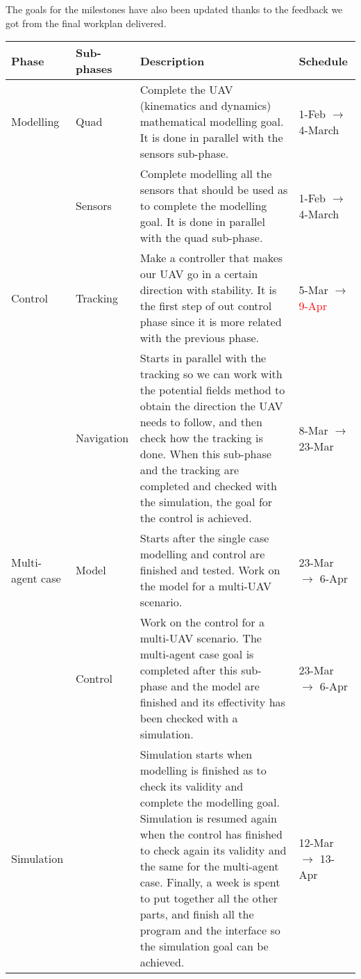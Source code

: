 \documentclass{article}
\begin{document}
The goals for the milestones have also been updated thanks to the feedback we got from the final workplan delivered.
	\begin{center}
	\begin{tabular}[H]{|C{2cm}|C{2cm}|C{7cm}|C{3cm}|} \hline
		Phase & Sub-phases & Description & Schedule\\ \hline
		Modelling & Quad & Complete the UAV (kinematics and dynamics) mathematical modelling goal. It is done in parallel with the sensors sub-phase. &  1-Feb $\rightarrow$ 4-March  \\ 
		& Sensors & Complete modelling all the sensors that should be used as to complete the modelling goal. It is done in parallel with the quad sub-phase. & 1-Feb $\rightarrow$ 4-March \\ \hline
		
		Control & Tracking & Make a controller that makes our UAV go in a certain direction with stability. It is the first step of out control phase since it is more related with the previous phase. &  5-Mar $\rightarrow$ \textcolor{red}{9-Apr}\\ 
		&Navigation & Starts in parallel with the tracking so we can work with the potential fields method to obtain the direction the UAV needs to follow, and then check how the tracking is done. When this sub-phase and the tracking are completed and checked with the simulation, the goal for the control is achieved. & 8-Mar $\rightarrow$ 23-Mar \\ \hline
		
		Multi-agent case & Model & Starts after the single case modelling and control are finished and tested. Work on the model for a multi-UAV scenario. & 23-Mar $\rightarrow$ 6-Apr\\ 
		&Control & Work on the control for a multi-UAV scenario. The multi-agent case goal is completed after this sub-phase and the model are finished and its effectivity has been checked with a simulation. & 23-Mar $\rightarrow$ 6-Apr \\ \hline
		
		Simulation & & Simulation starts when modelling is finished as to check its validity and complete the modelling goal. Simulation is resumed again when the control has finished to check again its validity and the same for the multi-agent case. Finally, a week is spent to put together all the other parts, and finish all the program and the interface so the simulation goal can be achieved. & 12-Mar $\rightarrow$ 13-Apr \\ \hline
		

\end{tabular}
\end{center}
\end{document}
